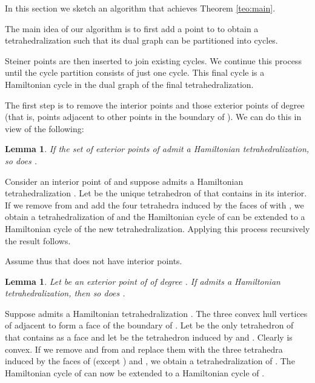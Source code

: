 \documentclass{article}
\newtheorem{lemma}[theorem]{Lemma}
\def\QED{\ensuremath{{\square}}}
\def\markatright#1{\leavevmode\unskip\nobreak\quad\hspace*{\fill}{#1}}
\newenvironment{proof}
  {\begin{trivlist}\item[\hskip\labelsep{\bf Proof.}]}
  {\markatright{\QED}\end{trivlist}}
\begin{document}
In this section we sketch an algorithm that achieves Theorem \ref{teo:main}.\par

The main idea of our algorithm is to first add a point to   to obtain
a tetrahedralization such that its dual graph can be
partitioned into cycles.\par

Steiner points are then inserted to join existing 
cycles. We continue this process until
the cycle partition consists of just one cycle. This final
cycle is a Hamiltonian cycle in the dual graph of the final
tetrahedralization.\par

The first step is to remove the interior points and 
those exterior points of degree  (that is, points
adjacent to  other points in the boundary of ).
We can do this in view of the following: 

\begin{lemma}\label{obsconv}
  If the set of exterior points of  admit a Hamiltonian 
  tetrahedralization, so does .
 \end{lemma}
 
\begin{proof}
Consider an interior point  of  and suppose 
 admits a Hamiltonian tetrahedralization .
Let  be the unique tetrahedron of  that 
contains  in its interior. If we remove  from
 and add the four tetrahedra induced by
the faces of  with , 
we obtain a tetrahedralization of  and 
the Hamiltonian cycle of   can be extended 
to a Hamiltonian cycle of the new tetrahedralization.
Applying this process recursively the result follows.
\end{proof} 

Assume thus that  does not have interior points.

\begin{lemma} \label{theo1}
Let  be an exterior point of  of degree . If 
 admits a Hamiltonian tetrahedralization, then so does
.
\end{lemma}

\begin{proof}
Suppose  admits a Hamiltonian tetrahedralization 
. The three convex hull vertices of  
adjacent to  form a face   of the boundary of
 .
Let  be the only tetrahedron of  that 
contains  as a face and let  be the 
tetrahedron induced by  and . Clearly 
is convex.
If we remove  and   from 
 and replace them
with the three tetrahedra induced by the faces of 
(except ) and , we obtain a tetrahedralization 
 of . The Hamiltonian cycle of 
 can now be extended to a Hamiltonian cycle
of .
\end{proof}
\end{document}
